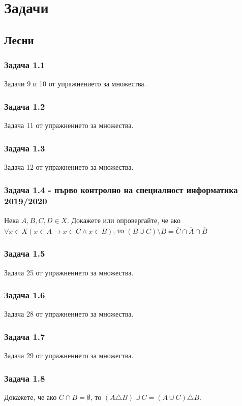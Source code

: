 \documentclass[12pt]{article}
\begin{document}
\section*{Задачи}

\subsection*{Лесни}
\subsubsection*{Задача 1.1}
Задачи 9 и 10 от упражнението за множества.

\subsubsection*{Задача 1.2}
Задача 11 от упражнението за множества.

\subsubsection*{Задача 1.3}
Задача 12 от упражнението за множества.

\subsubsection*{Задача 1.4 - първо контролно на специалност информатика 2019/2020}
Нека $A, B, C, D \in X$. Докажете или опровергайте, че ако $\forall x \in X (x \in A \rightarrow x \in C \land x \in B)$, то $(B \cup C) \setminus B = \overline{\overline{C} \cap \overline{A}} \cap \overline{B}$

\subsubsection*{Задача 1.5}
Задача 25 от упражнението за множества.

\subsubsection*{Задача 1.6}
Задача 28 от упражнението за множества.

\subsubsection*{Задача 1.7}
Задача 29 от упражнението за множества.

\subsubsection*{Задача 1.8}
Докажете, че ако $C \cap B = \emptyset$, то $(A \triangle B) \cup C = (A \cup C) \triangle B$.
\end{document}
